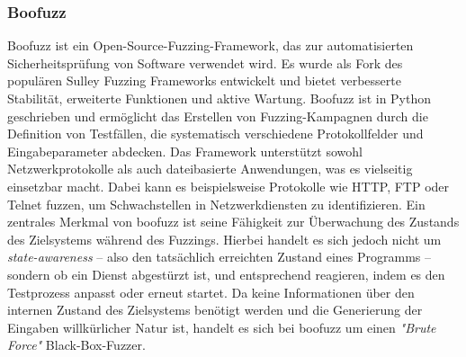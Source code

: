 \subsubsection{Boofuzz}\label{subsubsec:boofuzz}
Boofuzz ist ein Open-Source-Fuzzing-Framework, das zur automatisierten Sicherheitsprüfung von Software verwendet wird.
Es wurde als Fork des populären Sulley Fuzzing Frameworks entwickelt und bietet verbesserte Stabilität, erweiterte Funktionen
und aktive Wartung.
Boofuzz ist in Python geschrieben und ermöglicht das Erstellen von Fuzzing-Kampagnen durch die Definition von Testfällen,
die systematisch verschiedene Protokollfelder und Eingabeparameter abdecken.
Das Framework unterstützt sowohl Netzwerkprotokolle als auch dateibasierte Anwendungen, was es vielseitig einsetzbar macht.
Dabei kann es beispielsweise Protokolle wie HTTP, FTP oder Telnet fuzzen, um Schwachstellen in Netzwerkdiensten zu identifizieren.
Ein zentrales Merkmal von boofuzz ist seine Fähigkeit zur Überwachung des Zustands des Zielsystems während des Fuzzings.
Hierbei handelt es sich jedoch nicht um \textit{state-awareness} -- also den tatsächlich erreichten Zustand eines Programms --
sondern ob ein Dienst abgestürzt ist, und entsprechend reagieren, indem es den Testprozess anpasst oder erneut startet.
Da keine Informationen über den internen Zustand des Zielsystems benötigt werden und die Generierung der Eingaben
willkürlicher Natur ist, handelt es sich bei boofuzz um einen \textit{"Brute Force"} Black-Box-Fuzzer.
